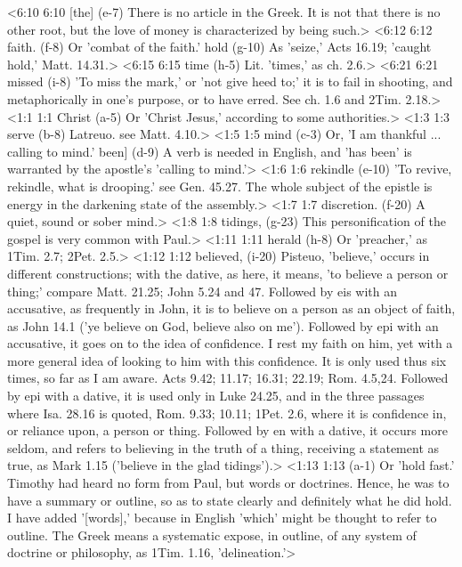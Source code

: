 <6:10 6:10  [the] (e-7)  There is no article in the Greek. It is not that there is no  other root, but the love of money is characterized by being  such.>
<6:12 6:12  faith. (f-8)  Or 'combat of the faith.'
  hold (g-10)  As 'seize,' Acts 16.19; 'caught hold,' Matt. 14.31.>
<6:15 6:15  time (h-5)  Lit. 'times,' as ch. 2.6.>
<6:21 6:21  missed (i-8)  'To miss the mark,' or 'not give heed to;' it is to fail in  shooting, and metaphorically in one's purpose, or to have  erred. See ch. 1.6 and 2Tim. 2.18.>
<1:1 1:1  Christ (a-5)  Or 'Christ Jesus,' according to some authorities.>
<1:3 1:3  serve (b-8)  Latreuo. see Matt. 4.10.>
<1:5 1:5  mind (c-3)  Or, 'I am thankful ... calling to mind.'
  been] (d-9)  A verb is needed in English, and 'has been' is warranted by  the apostle's 'calling to mind.'>
<1:6 1:6  rekindle (e-10)  'To revive, rekindle, what is drooping.' see Gen. 45.27. The  whole subject of the epistle is energy in the darkening state  of the assembly.>
<1:7 1:7  discretion. (f-20)  A quiet, sound or sober mind.>
<1:8 1:8  tidings, (g-23)  This personification of the gospel is very common with Paul.>
<1:11 1:11  herald (h-8)  Or 'preacher,' as 1Tim. 2.7; 2Pet. 2.5.>
<1:12 1:12  believed, (i-20)  Pisteuo, 'believe,' occurs in different constructions; with  the dative, as here, it means, 'to believe a person or thing;'  compare Matt. 21.25; John 5.24 and 47. Followed by eis with  an accusative, as frequently in John, it is to believe on a  person as an object of faith, as John 14.1 ('ye believe on God,  believe also on me'). Followed by epi with an accusative, it  goes on to the idea of confidence. I rest my faith on him, yet  with a more general idea of looking to him with this  confidence. It is only used thus six times, so far as I am  aware. Acts 9.42; 11.17; 16.31; 22.19; Rom. 4.5,24. Followed by  epi with a dative, it is used only in Luke 24.25, and in the  three passages where Isa. 28.16 is quoted, Rom. 9.33; 10.11; 1Pet. 2.6, where it is confidence in, or reliance upon, a  person or thing. Followed by en with a dative, it occurs more  seldom, and refers to believing in the truth of a thing,  receiving a statement as true, as Mark 1.15 ('believe in the  glad tidings').>
<1:13 1:13   (a-1)  Or 'hold fast.' Timothy had heard no form from Paul, but  words or doctrines. Hence, he was to have a summary or  outline, so as to state clearly and definitely what he did  hold. I have added '[words],' because in English 'which' might  be thought to refer to outline. The Greek means a systematic  expose, in outline, of any system of doctrine or philosophy,  as 1Tim. 1.16, 'delineation.'>
